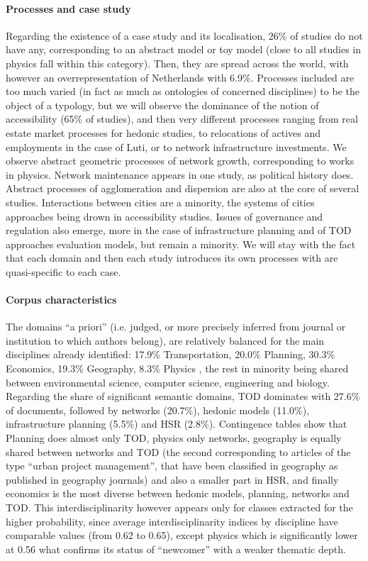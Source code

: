 \documentclass[10pt]{article}
\begin{document}
\paragraph{Processes and case study}

Regarding the existence of a case study and its localisation, 26\% of studies do not have any, corresponding to an abstract model or toy model (close to all studies in physics fall within this category). Then, they are spread across the world, with however an overrepresentation of Netherlands with 6.9\%. Processes included are too much varied (in fact as much as ontologies of concerned disciplines) to be the object of a typology, but we will observe the dominance of the notion of accessibility (65\% of studies), and then very different processes ranging from real estate market processes for hedonic studies, to relocations of actives and employments in the case of Luti, or to network infrastructure investments. We observe abstract geometric processes of network growth, corresponding to works in physics. Network maintenance appears in one study, as political history does. Abstract processes of agglomeration and dispersion are also at the core of several studies. Interactions between cities are a minority, the systems of cities approaches being drown in accessibility studies. Issues of governance and regulation also emerge, more in the case of infrastructure planning and of TOD approaches evaluation models, but remain a minority. We will stay with the fact that each domain and then each study introduces its own processes with are quasi-specific to each case.

\paragraph{Corpus characteristics}

The domains ``a priori'' (i.e. judged, or more precisely inferred from journal or institution to which authors belong), are relatively balanced for the main disciplines already identified: 17.9\% Transportation, 20.0\% Planning, 30.3\% Economics, 19.3\% Geography, 8.3\% Physics , the rest in minority being shared between environmental science, computer science, engineering and biology. Regarding the share of significant semantic domains, TOD dominates with 27.6\% of documents, followed by networks (20.7\%), hedonic models (11.0\%), infrastructure planning (5.5\%) and HSR (2.8\%). Contingence tables show that Planning does almost only TOD, physics only networks, geography is equally shared between networks and TOD (the second corresponding to articles of the type ``urban project management'', that have been classified in geography as published in geography journals) and also a smaller part in HSR, and finally economics is the most diverse between hedonic models, planning, networks and TOD. This interdisciplinarity however appears only for classes extracted for the higher probability, since average interdisciplinarity indices by discipline have comparable values (from 0.62 to 0.65), except physics which is significantly lower at 0.56 what confirms its status of ``newcomer'' with a weaker thematic depth.
\end{document}
